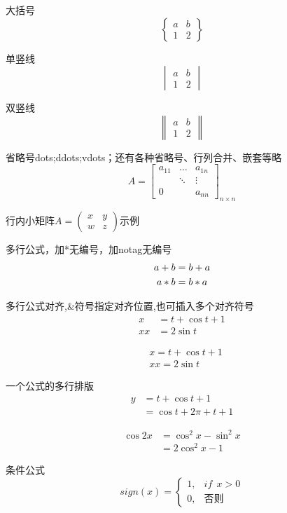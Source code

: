 \documentclass{ctexart}
\begin{document}
	大括号
	\[
	\begin{Bmatrix}
		a & b \\
		1 & 2
	\end{Bmatrix}
	\]
	
	单竖线
	\[
	\begin{vmatrix}
		a & b \\
		1 & 2
	\end{vmatrix}
	\]
	
	双竖线
	\[
	\begin{Vmatrix}
		a & b \\
		1 & 2
	\end{Vmatrix}
	\]
	
	省略号dots;ddots;vdots；还有各种省略号、行列合并、嵌套等略
	\[
	A=\begin{bmatrix}
	a_{11} & \dots & a_{1n} \\
	       & \ddots& \vdots \\
	0      &       & a_{nn}
	\end{bmatrix}_{n \times n}
	\]
	
	行内小矩阵\begin{math}
		A=\left(
		\begin{smallmatrix}
			x & y \\ w & z
		\end{smallmatrix}
		\right)
	\end{math}示例
	
	\newpage
	多行公式，加*无编号，加notag无编号
	\begin{gather}
	a+b=b+a \notag \\
	a*b=b*a
	\end{gather}
	
	多行公式对齐,\&符号指定对齐位置,也可插入多个对齐符号
	\begin{align}
		x &=t+ \cos{t}+1 \\
		xx &=2\sin{t}
	\end{align}
	
	\begin{align}
	&x =t+ \cos{t}+1 \\
	&xx =2\sin{t}
	\end{align}
	
	一个公式的多行排版
	\begin{align}
	y &=t+ \cos{t}+1 \\
	&=\cos{t+2\pi}+t+1
	\end{align}
	
	\begin{equation}
		\begin{split}
			\cos{2x}&=\cos^2{x}-\sin^2{x} \\
			        &=2\cos^2{x}-1
		\end{split}
	\end{equation}
	
	条件公式
	\begin{equation}
		sign(x)=\begin{cases}
			1, & if\ \ x>0 \\
			0, & \text{否则}
		\end{cases}
	\end{equation}
	
	
	
\end{document}
